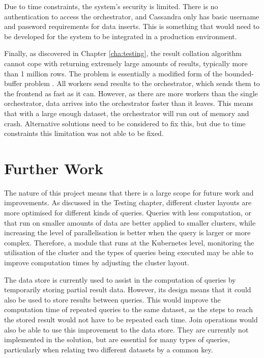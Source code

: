 Due to time constraints, the system's security is limited. There is no authentication to access the orchestrator, and Cassandra only has basic username and password requirements for data inserts. This is something that would need to be developed for the system to be integrated in a production environment.

Finally, as discovered in Chapter \ref{cha:testing}, the result collation algorithm cannot cope with returning extremely large amounts of results, typically more than 1 million rows. The problem is essentially a modified form of the bounded-buffer problem . All workers send results to the orchestrator, which sends them to the frontend as fast as it can. However, as there are more workers than the single orchestrator, data arrives into the orchestrator faster than it leaves. This means that with a large enough dataset, the orchestrator will run out of memory and crash. Alternative solutions need to be considered to fix this, but due to time constraints this limitation was not able to be fixed.

\section{Further Work}
The nature of this project means that there is a large scope for future work and improvements. As discussed in the Testing chapter, different cluster layouts are more optimised for different kinds of queries. Queries with less computation, or that run on smaller amounts of data are better applied to smaller clusters, while increasing the level of parallelisation is better when the query is larger or more complex. Therefore, a module that runs at the Kubernetes level, monitoring the utilisation of the cluster and the types of queries being executed may be able to improve computation times by adjusting the cluster layout.

The data store is currently used to assist in the computation of queries by temporarily storing partial result data. However, its design means that it could also be used to store results between queries. This would improve the computation time of repeated queries to the same dataset, as the steps to reach the stored result would not have to be repeated each time. Join operations would also be able to use this improvement to the data store. They are currently not implemented in the solution, but are essential for many types of queries, particularly when relating two different datasets by a common key.

